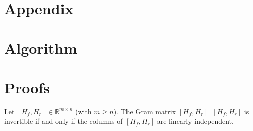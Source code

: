 \section* {Appendix}

%
%
%
%
\section{Algorithm}\label{app:algo}


\section{Proofs}\label{app:proofs}
\begin{lemma} \label{app:lemma_1}
Let \( [H_f, H_r] \in \mathbb{R}^{m \times n} \) (with \( m \geq n \)). The Gram matrix \( [H_f, H_r]^\top [H_f, H_r] \) is invertible if and only if the columns of \( [H_f, H_r] \) are linearly independent.
\end{lemma}

